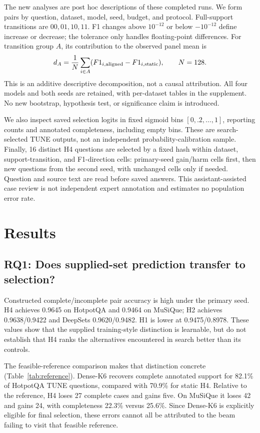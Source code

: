\documentclass[preprint,12pt]{elsarticle}
\begin{document}
The new analyses are post hoc descriptions of these completed runs. We form pairs by question, dataset, model, seed, budget, and protocol. Full-support transitions are $00,01,10,11$. F1 changes above $10^{-12}$ or below $-10^{-12}$ define increase or decrease; the tolerance only handles floating-point differences. For transition group $A$, its contribution to the observed panel mean is
\begin{equation}\label{eq:decomp}
d_A=\frac{1}{N}\sum_{i\in A}(F1_{i,\rm aligned}-F1_{i,\rm static}),\qquad N=128.
\end{equation}
This is an additive descriptive decomposition, not a causal attribution. All four models and both seeds are retained, with per-dataset tables in the supplement. No new bootstrap, hypothesis test, or significance claim is introduced.

We also inspect saved selection logits in fixed sigmoid bins $[0,.2,\ldots,1]$, reporting counts and annotated completeness, including empty bins. These are search-selected TUNE outputs, not an independent probability-calibration sample. Finally, 16 distinct H4 questions are selected by a fixed hash within dataset, support-transition, and F1-direction cells: primary-seed gain/harm cells first, then new questions from the second seed, with unchanged cells only if needed. Question and source text are read before saved answers. This assistant-assisted case review is not independent expert annotation and estimates no population error rate.

\section{Results}
\subsection{RQ1: Does supplied-set prediction transfer to selection?}
Constructed complete/incomplete pair accuracy is high under the primary seed. H4 achieves 0.9645 on HotpotQA and 0.9464 on MuSiQue; H2 achieves 0.9638/0.9422 and DeepSets 0.9620/0.9482. H1 is lower at 0.9475/0.8978. These values show that the supplied training-style distinction is learnable, but do not establish that H4 ranks the alternatives encountered in search better than its controls.


The feasible-reference comparison makes that distinction concrete (Table~\ref{tab:reference}). Dense-K6 recovers complete annotated support for 82.1\% of HotpotQA TUNE questions, compared with 70.9\% for static H4. Relative to the reference, H4 loses 27 complete cases and gains five. On MuSiQue it loses 42 and gains 24, with completeness 22.3\% versus 25.6\%. Since Dense-K6 is explicitly eligible for final selection, these errors cannot all be attributed to the beam failing to visit that feasible reference.
\end{document}
